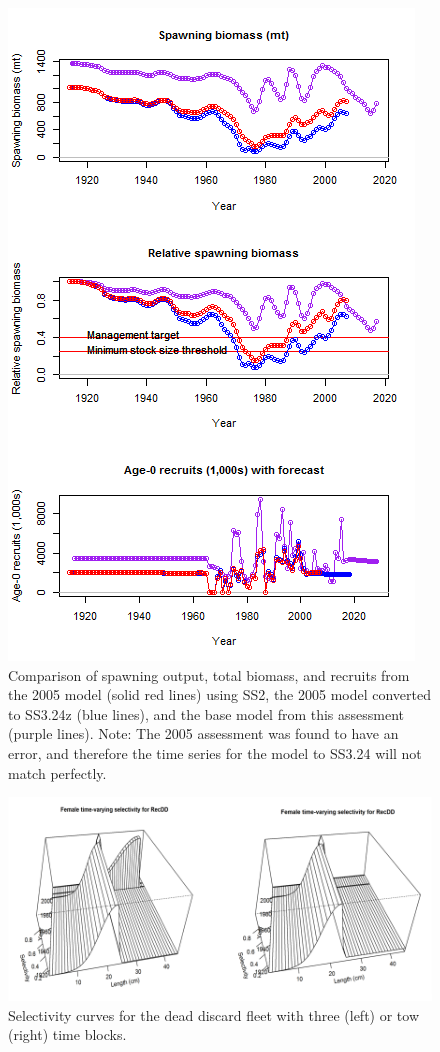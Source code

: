 \documentclass[12pt,]{article}
\begin{document}
\begin{figure}[htbp]
\centering
\includegraphics{Figures/bridge_timeseries.png}
\caption{Comparison of spawning output, total biomass, and recruits from
the 2005 model (solid red lines) using SS2, the 2005 model converted to
SS3.24z (blue lines), and the base model from this assessment (purple
lines). Note: The 2005 assessment was found to have an error, and
therefore the time series for the model to SS3.24 will not match
perfectly. \label{fig:bridge_timeseries}}
\end{figure}

\begin{figure}[htbp]
\centering
\includegraphics{Figures/Request1.png}
\caption{Selectivity curves for the dead discard fleet with three (left)
or tow (right) time blocks. \label{fig:Request1}}
\end{figure}
\end{document}
